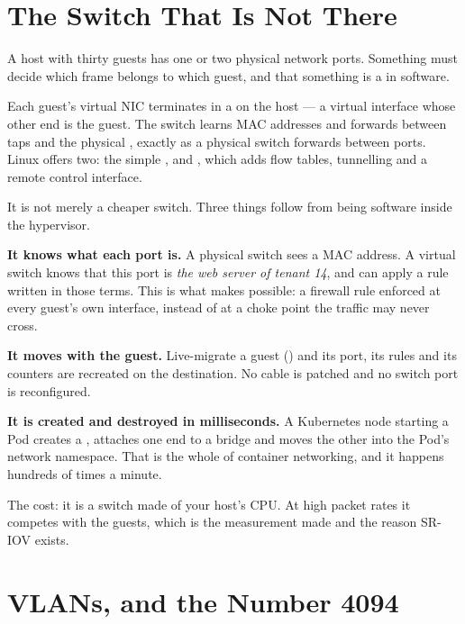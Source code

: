 \section{The Switch That Is Not There}

A host with thirty guests has one or two physical network ports. Something must
decide which frame belongs to which guest, and that something is a
 in software.

Each guest's virtual NIC terminates in a  on the host --- a
virtual interface whose other end is the guest. The switch learns MAC addresses
and forwards between taps and the physical , exactly as a physical
switch forwards between ports. Linux offers two: the simple , and
, which adds flow tables, tunnelling and a remote control
interface.

\begin{conceptbox}
It is not merely a cheaper switch. Three things follow from being software
inside the hypervisor.

\smallskip
\textbf{It knows what each port is.} A physical switch sees a MAC address. A
virtual switch knows that this port is \emph{the web server of tenant 14}, and
can apply a rule written in those terms. This is what makes
 possible: a firewall rule enforced at every guest's
own interface, instead of at a choke point the traffic may never cross.

\smallskip
\textbf{It moves with the guest.} Live-migrate a guest () and
its port, its rules and its counters are recreated on the destination. No
cable is patched and no switch port is reconfigured.

\smallskip
\textbf{It is created and destroyed in milliseconds.} A Kubernetes node
starting a Pod creates a , attaches one end to a bridge and
moves the other into the Pod's network namespace. That is the whole of
container networking, and it happens hundreds of times a minute.

\smallskip
The cost: it is a switch made of your host's CPU. At high packet rates it
competes with the guests, which is the measurement  made and
the reason SR-IOV exists.
\end{conceptbox}

\section{VLANs, and the Number 4094}

